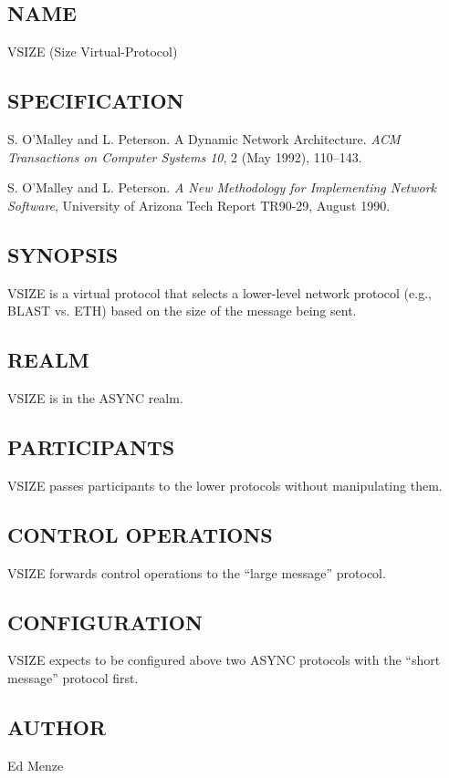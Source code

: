 \subsection*{NAME}

\noindent VSIZE (Size Virtual-Protocol)

\subsection*{SPECIFICATION}

\noindent 
S. O'Malley and L. Peterson.  A Dynamic Network Architecture.  {\it
ACM Transactions on Computer Systems 10}, 2 (May 1992), 110--143.

\medskip
\noindent  S. O'Malley and L. Peterson. {\it A New Methodology for
Implementing Network Software}, University of Arizona Tech Report
TR90-29, August 1990.

\subsection*{SYNOPSIS}

\noindent VSIZE is a virtual protocol that selects a lower-level
network protocol (e.g., BLAST vs. ETH) based on the size of the
message being sent.

\subsection*{REALM}

VSIZE is in the ASYNC realm.

\subsection*{PARTICIPANTS}

VSIZE passes participants to the lower protocols without manipulating
them. 

\subsection*{CONTROL OPERATIONS}

VSIZE forwards control operations to the ``large message'' protocol.

\subsection*{CONFIGURATION}

VSIZE expects to be configured above two ASYNC protocols with the
``short message'' protocol first.

\subsection*{AUTHOR}

\noindent Ed Menze
